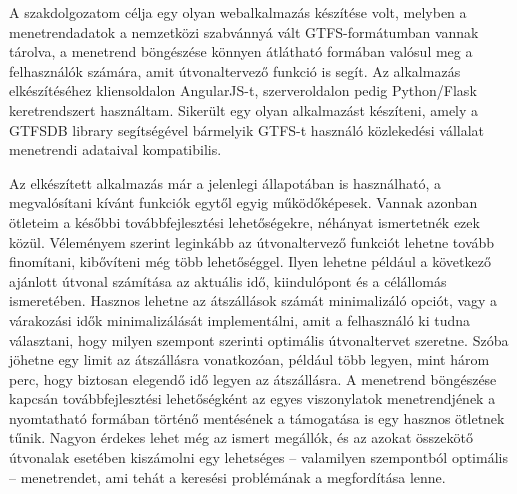 
A szakdolgozatom célja egy olyan webalkalmazás készítése volt, melyben a menetrendadatok a nemzetközi szabvánnyá vált GTFS-formátumban vannak tárolva, a menetrend böngészése könnyen átlátható formában valósul meg a felhasználók számára, amit útvonaltervező funkció is segít. Az alkalmazás elkészítéséhez kliensoldalon AngularJS-t, szerveroldalon pedig Python/Flask keretrendszert használtam. Sikerült egy olyan alkalmazást készíteni, amely a GTFSDB library segítségével bármelyik GTFS-t használó közlekedési vállalat menetrendi adataival kompatibilis.

Az elkészített alkalmazás már a jelenlegi állapotában is használható, a megvalósítani kívánt funkciók egytől egyig működőképesek. Vannak azonban ötleteim a későbbi továbbfejlesztési lehetőségekre, néhányat ismertetnék ezek közül. Véleményem szerint leginkább az útvonaltervező funkciót lehetne tovább finomítani, kibővíteni még több lehetőséggel. Ilyen lehetne például a következő ajánlott útvonal számítása az aktuális idő, kiindulópont és a célállomás ismeretében. Hasznos lehetne az átszállások számát minimalizáló opciót, vagy a várakozási idők minimalizálását implementálni, amit a felhasználó ki tudna választani, hogy milyen szempont szerinti optimális útvonaltervet szeretne. Szóba jöhetne egy limit az átszállásra vonatkozóan, például több legyen, mint három perc, hogy biztosan elegendő idő legyen az átszállásra. A menetrend böngészése kapcsán továbbfejlesztési lehetőségként az egyes viszonylatok menetrendjének a nyomtatható formában történő mentésének a támogatása is egy hasznos ötletnek tűnik. Nagyon érdekes lehet még az ismert megállók, és az azokat összekötő útvonalak esetében kiszámolni egy lehetséges – valamilyen szempontból optimális – menetrendet, ami tehát a keresési problémának a megfordítása lenne.
